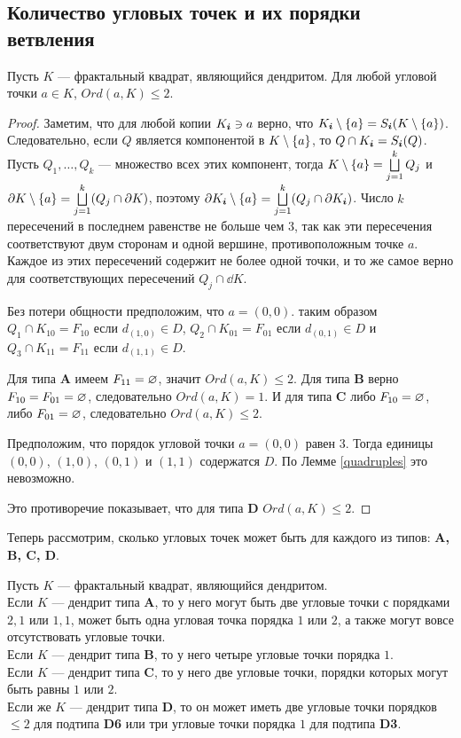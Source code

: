 \subsection{Количество угловых точек и их порядки ветвления}

\begin{theorem}\label{thm:vertex_branching}
Пусть $K$ --- фрактальный квадрат, являющийся дендритом.
Для любой угловой точки $a\in K$,
 $Ord(a,K)\leq 2$.
\end{theorem}

\begin{proof}\label{proof:vertex_branching}
Заметим, что для любой копии $K_{\bm{i}}\ni a$ верно, что 
$K_{\bm{i}}\setminus \{a\}=S_{\bm{i}}(K\setminus \{a\})$. 
Следовательно, если $Q$ является компонентой в $K\setminus \{a\}$, то $Q\cap K_{\bm{i}}=S_{\bm{i}}(Q)$. 
Пусть $Q_1,\ldots, Q_k$ --- множество всех этих компонент, тогда $K\setminus \{a\}=\bigsqcup \limits_{j=1}^kQ_j$ и $\partial K\setminus \{a\}=\bigsqcup \limits_{j=1}^k(Q_j\cap\partial K)$, поэтому $\partial K_{\bm{i}}\setminus \{a\}=\bigsqcup \limits_{j=1}^k(Q_j\cap\partial K_{\bm{i}})$. 
Число $k$ пересечений в последнем равенстве не больше чем $3$, так как эти пересечения соответствуют двум сторонам и одной вершине, противоположным точке $a$. 
Каждое из этих пересечений содержит не более одной точки, и то же самое верно для соответствующих пересечений $Q_j\cap\dd K$.

Без потери общности предположим, что  $a=(0,0)$.  
таким образом $Q_1\cap K_{10}=F_{10}$ если $d_{(1,0)}\in D$, $Q_2\cap K_{01}=F_{01}$ если $d_{(0,1)}\in D$ и $Q_3\cap K_{11}=F_{11}$ если $d_{(1,1)}\in D$.

Для типа {\bf A} имеем $F_{11}=\varnothing$, значит $Ord(a,K)\leq 2$.
Для типа {\bf B} верно $F_{10}=F_{01}=\varnothing$, следовательно $Ord(a,K)=1$.
И для типа {\bf C} либо $F_{10}=\varnothing$, либо $F_{01}=\varnothing$, следовательно $Ord(a,K)\leq 2$.

Предположим, что порядок угловой точки $a=(0,0)$ равен $3$.
Тогда единицы $(0,0)$, $(1,0)$, $(0,1)$ и $(1,1)$ содержатся $D$. 
По Лемме \ref{quadruples} это невозможно.

Это противоречие показывает, что для типа {\bf D} $Ord(a,K)\leq 2$.
\end{proof}

Теперь рассмотрим, сколько угловых точек может быть для каждого из типов: {\bf A, B, C, D}.

\begin{theorem}\label{thm:corner}
Пусть $K$ --- фрактальный квадрат, являющийся дендритом. \\
Если $K$ --- дендрит типа  {\bf A}, то у него могут быть две угловые точки с порядками $2,1$ или $1,1$, может быть одна угловая точка порядка $1$ или $2$, а также могут вовсе отсутствовать угловые точки.\\
Если $K$ --- дендрит типа  {\bf B}, то у него четыре угловые точки порядка $1$.\\
Если $K$ --- дендрит типа  {\bf C}, то у него две угловые точки, порядки которых могут быть равны $1$ или $2$.\\
Если же $K$ --- дендрит типа  {\bf D}, то он может иметь две угловые точки порядков $\le 2$ для подтипа {\bf D6} или три угловые точки порядка $1$ для подтипа {\bf D3}.
\end{theorem}

